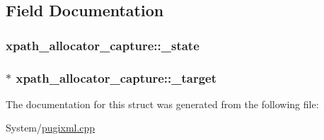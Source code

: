 \subsection{Field Documentation}
\hypertarget{structxpath__allocator__capture_a275859dc99681c12b42ee4f51b713d39}{
\subsubsection[{\-\_\-state}]{ xpath\-\_\-allocator\-\_\-capture\-::\-\_\-state}}\label{structxpath__allocator__capture_a275859dc99681c12b42ee4f51b713d39}
\hypertarget{structxpath__allocator__capture_a382acca931c691699ec84a03fb060cf4}{
\subsubsection[{\-\_\-target}]{$\ast$ xpath\-\_\-allocator\-\_\-capture\-::\-\_\-target}}\label{structxpath__allocator__capture_a382acca931c691699ec84a03fb060cf4}


The documentation for this struct was generated from the following file\-:\begin{DoxyCompactItemize}
\item 
System/\hyperlink{pugixml_8cpp}{pugixml.\-cpp}\end{DoxyCompactItemize}
